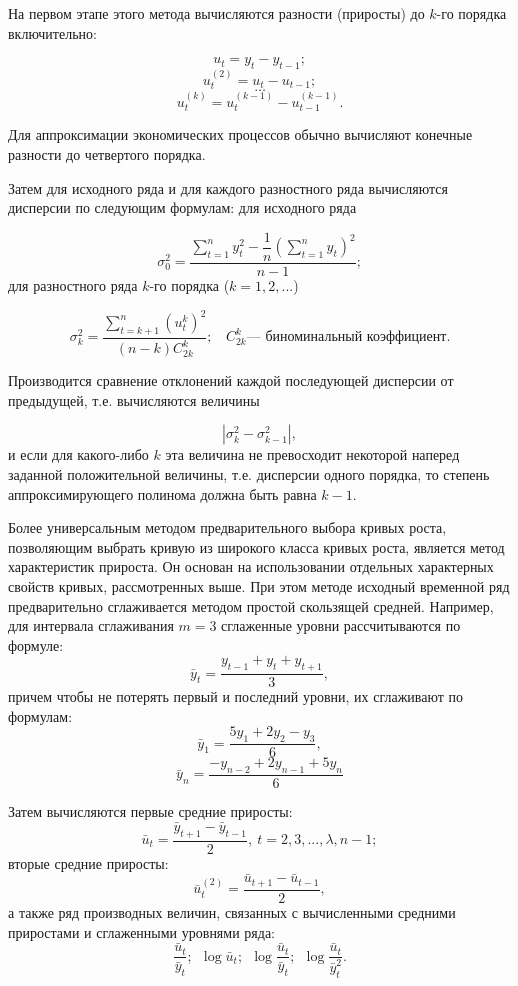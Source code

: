 На первом этапе этого метода вычисляются разности (приросты) до $k$-го порядка включительно:

\[ u_t =y_t - y_{t-1};\]
\[ u_t^{(2)} =u_t - u_{t-1}; \]
\[ \dots \]
\[u_t^{(k)} =u_t^{(k-1)} - u_{t-1}^{(k-1)}. \]

Для аппроксимации экономических процессов обычно вычисляют конечные разности до четвертого порядка.

Затем для исходного ряда и для каждого разностного ряда вычисляются дисперсии по следующим формулам: для исходного ряда

\[ \sigma_0^2 = \dfrac{\sum\limits_{t=1}^{n}y_t^2 - \dfrac{1}{n}\left(\sum\limits_{t=1}^{n}y_t\right)^2}{n-1}; \]
для разностного ряда $k$-го порядка ($k = 1, 2,...$)

\[ \sigma_k^2 =\dfrac{\sum\limits_{t=k+1}^{n}(u_t^k)^2}{(n-k)C_{2k}^k}; \ \ \ \ C_{2k}^k \text{--- биноминальный коэффициент.} \]

Производится сравнение отклонений каждой последующей дисперсии от предыдущей, т.е. вычисляются величины

\[ |\sigma_k^2 - \sigma_{k-1}^2|, \]
и если для какого-либо $k$ эта величина не превосходит некоторой наперед заданной положительной величины, т.е. дисперсии одного порядка, то степень аппроксимирующего полинома должна быть равна $k - 1$.

Более универсальным методом предварительного выбора кривых роста, позволяющим выбрать кривую из широкого класса кривых роста, является метод характеристик прироста. Он основан на использовании отдельных характерных свойств кривых, рассмотренных выше. При этом методе исходный временной ряд предварительно сглаживается методом простой скользящей средней. Например, для интервала сглаживания $m = 3$ сглаженные уровни рассчитываются по формуле:
\[ \bar{y}_t = \dfrac{y_{t-1} + y_t + y_{t+1}}{3}, \]
причем чтобы не потерять первый и последний уровни, их сглаживают по формулам:
\[ \bar{y}_1 = \dfrac{5y_{1} + 2y_2 - y_{3}}{6}, \]
\[ \bar{y}_n = \dfrac{-y_{n-2} + 2y_{n-1} + 5y_{n}}{6} \]

Затем вычисляются первые средние приросты:
\[ \bar{u}_t = \dfrac{\bar{y}_{t+1} - \bar{y}_{t-1}}{2},\ t=2,3,...,\lambda,n-1; \]
вторые средние приросты:
 \[ \bar{u}_t^{(2)} = \dfrac{\bar{u}_{t+1} - \bar{u}_{t-1}}{2}, \]
 а также ряд производных величин, связанных с вычисленными средними приростами и сглаженными уровнями ряда:
\[ \frac{\bar{u}_t}{\bar{y}_t};\ \ \log \bar{u}_t;\ \ \log \dfrac{\bar{u}_t}{\bar{y}_t};\ \ \log \dfrac{\bar{u}_t}{\bar{y}_t^2}. \]

